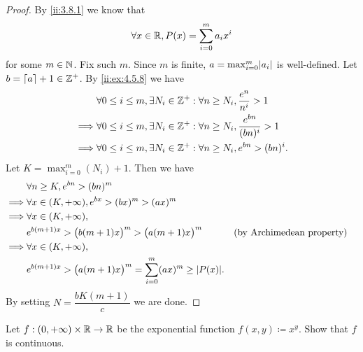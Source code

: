 \begin{proof}
  By \cref{ii:3.8.1} we know that
  \[
    \forall x \in \mathbb{R}, P(x) = \sum_{i = 0}^m a_i x^i
  \]
  for some \(m \in \mathbb{N}\).
  Fix such \(m\).
  Since \(m\) is finite, \(a = \max_{i = 0}^m \abs{a_i}\) is well-defined.
  Let \(b = \left\lceil a\right\rceil + 1 \in \mathbb{Z}^+\).
  By \cref{ii:ex:4.5.8} we have
  \begin{align*}
             & \forall 0 \leq i \leq m, \exists N_i \in \mathbb{Z}^+ : \forall n \geq N_i, \dfrac{e^n}{n^i} > 1       \\
    \implies & \forall 0 \leq i \leq m, \exists N_i \in \mathbb{Z}^+ : \forall n \geq N_i, \dfrac{e^{bn}}{(bn)^i} > 1 \\
    \implies & \forall 0 \leq i \leq m, \exists N_i \in \mathbb{Z}^+ : \forall n \geq N_i, e^{bn} > (bn)^i.
  \end{align*}
  Let \(K = \max_{i = 0}^m(N_i) + 1\).
  Then we have
  \begin{align*}
             & \forall n \geq K, e^{bn} > (bn)^m                                                                                        \\
    \implies & \forall x \in (K, +\infty), e^{bx} > (bx)^m > (ax)^m                                                                     \\
    \implies & \forall x \in (K, +\infty),                                                                                              \\
             & e^{b (m + 1) x} > \big(b (m + 1) x\big)^m > \big(a (m + 1) x\big)^m                &  & \text{(by Archimedean property)} \\
    \implies & \forall x \in (K, +\infty),                                                                                              \\
             & e^{b (m + 1) x} > \big(a (m + 1) x\big)^m = \sum_{i = 0}^m (ax)^m \geq \abs{P(x)}.
  \end{align*}
  By setting \(N = \dfrac{b K (m + 1)}{c}\) we are done.
\end{proof}

\begin{ex}\label{ii:ex:4.5.10}
  Let \(f : (0, +\infty) \times \mathbb{R} \to \mathbb{R}\) be the exponential function \(f(x, y) \coloneqq x^y\).
  Show that \(f\) is continuous.
\end{ex}

